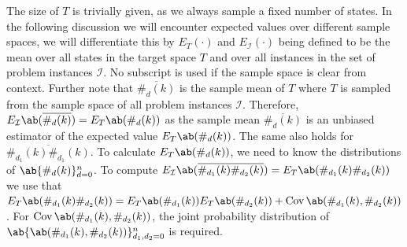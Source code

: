     The size of $T$ is trivially given, as we always sample a fixed number of states. In the following discussion we will encounter expected values over different sample spaces, we will differentiate this by $E_T(\cdot)$ and $E_{\mathcal{I}}(\cdot)$ being defined to be the mean over all states in the target space $T$ and over all instances in the set of problem instances $\mathcal{I}$. No subscript is used if the sample space is clear from context. Further note that $\overline{\#_d(k)}$ is the sample mean of $T$ where $T$ is sampled from the sample space of all problem instances $\mathcal{I}$. Therefore, $E_{\mathcal{I}}\ab(\overline{\#_d (k)}) = E_T \ab(\#_d (k))$ as the sample mean $\overline{\#_d(k)}$ is an unbiased estimator of the expected value $E_T \ab(\#_d (k))$. The same also holds for $\overline{\#_{d_1}(k) \#_{d_1}(k)}$. To calculate $E_T\ab(\#_d (k))$, we need to know the distributions of $\ab\{\#_d (k)\}_{d=0}^n$. To compute $E_{\mathcal{I}}\ab(\overline{\#_{d_1} (k) \#_{d_2} (k)}) = E_T \ab(\#_{d_1} (k) \#_{d_2} (k))$ we use that $E_T \ab(\#_{d_1}(k) \#_{d_2} (k)) = E_T \ab(\#_{d_1}(k)) E_T \ab(\#_{d_2}(k)) + \Cov\ab(\#_{d_1} (k), \#_{d_2} (k))$. For $\Cov \ab(\#_{d_1} (k), \#_{d_2} (k))$, the joint probability distribution of $\ab\{\ab(\#_{d_1} (k), \#_{d_2} (k))\}_{d_1, d_2 = 0}^n$ is required.

